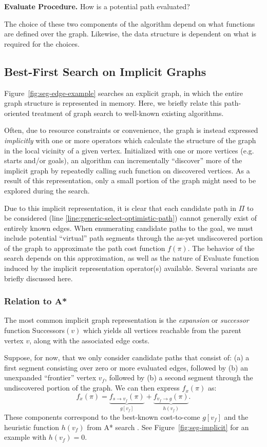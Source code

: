\documentclass{report}
\begin{document}
\textbf{{\sc Evaluate} Procedure.}
How is a potential path evaluated?

The choice of these two components of the algorithm depend on what
functions are defined over the graph.
Likewise, the data structure is dependent on what is required
for the choices.

\subsection{Best-First Search on Implicit Graphs}
\label{sec:implicit}

Figure~\ref{fig:seg-edge-example} searches an explicit graph,
in which the entire graph structure is represented in memory.
Here, we briefly relate this path-oriented treatment of graph search
to well-known existing algorithms.

Often, due to resource constraints or convenience,
the graph is instead expressed \emph{implicitly}
with one or more operators which calculate the structure of the graph
in the local vicinity of a given vertex.
Initialized with one or more vertices (e.g. starts and/or goals),
an algorithm can incrementally ``discover'' more of the implicit
graph by repeatedly calling such function on discovered vertices.
As a result of this representation,
only a small portion of the graph might need to be explored
during the search.

Due to this implicit representation,
it is clear that each candidate path in $\Pi$ to be considered
(line \ref{line:generic-select-optimistic-path})
cannot generally exist of entirely known edges.
When enumerating candidate paths to the goal,
we must include potential ``virtual'' path segments
through the as-yet undiscovered portion of the graph
to approximate the path cost function $f(\pi)$.
The behavior of the search depends on this approximation,
as well as the nature of {\sc Evaluate} function induced by
the implicit representation operator(s) available.
Several variants are briefly discussed here.

\subsubsection{Relation to A*}

The most common implicit graph representation
is the \emph{expansion} or \emph{successor} function {\sc Successors}$(v)$
which yields all vertices reachable from the parent vertex $v$,
along with the associated edge costs.

Suppose, for now, that we only consider candidate paths that consist of:
(a) a first segment consisting over zero or more evaluated edges,
followed by
(b) an unexpanded ``frontier'' vertex $v_f$, followed by
(b) a second segment through the undiscovered portion of the graph.
We can then express $f_x(\pi)$ as:
\begin{equation}
   f_x(\pi)
   = \underbrace{f_{s \rightarrow v_f}(\pi)}_{g[v_f]}
   + \underbrace{f_{v_f \rightarrow g}(\pi)}_{h(v_f)}.
\end{equation}
These components correspond to the best-known cost-to-come $g[v_f]$
and the heuristic function $h(v_f)$ from A* search \cite{hart1968astar}.
See Figure~\ref{fig:seg-implicit} for an example with $h(v_f)=0$.
\end{document}
